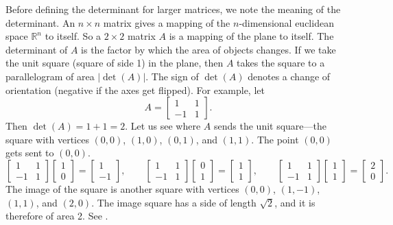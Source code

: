 Before defining the
determinant for larger matrices, we note
the meaning of the determinant.
An $n \times n$ matrix
gives a mapping of the $n$-dimensional euclidean space ${\mathbb{R}}^n$ to 
itself.
So a $2 \times 2$ matrix $A$ is a mapping of
the plane to itself.  The determinant of 
$A$ is the factor by which the area of objects changes. 
If we take the unit square (square of side 1) in the plane, then
$A$ takes the square to a parallelogram of area $\lvert\det(A)\rvert$.  The sign
of $\det(A)$ denotes a change of orientation (negative if the axes get flipped).  For
example, let
\begin{equation*}
A =
\begin{bmatrix}
1 & 1 \\
-1 & 1
\end{bmatrix} .
\end{equation*}
Then $\det(A) = 1+1 = 2$.
Let us see where $A$ sends the unit square---the square with vertices
$(0,0)$, $(1,0)$, $(0,1)$, and $(1,1)$.
The point $(0,0)$ gets sent
to $(0,0)$.  
\begin{equation*}
\begin{bmatrix}
1 & 1 \\
-1 & 1
\end{bmatrix}
\begin{bmatrix}
1 \\ 0
\end{bmatrix} =
\begin{bmatrix}
1 \\
-1 
\end{bmatrix}
,
\qquad
\begin{bmatrix}
1 & 1 \\
-1 & 1
\end{bmatrix}
\begin{bmatrix}
0 \\ 1
\end{bmatrix} =
\begin{bmatrix}
1 \\
1 
\end{bmatrix}
,
\qquad
\begin{bmatrix}
1 & 1 \\
-1 & 1
\end{bmatrix}
\begin{bmatrix}
1 \\ 1
\end{bmatrix} =
\begin{bmatrix}
2 \\
0 
\end{bmatrix}
.
\end{equation*}
The image of the square is another square with vertices $(0,0)$, $(1,-1)$,
$(1,1)$, and $(2,0)$.  The
image square has
a side of length $\sqrt{2}$, and it is therefore of area 2.  See
.

